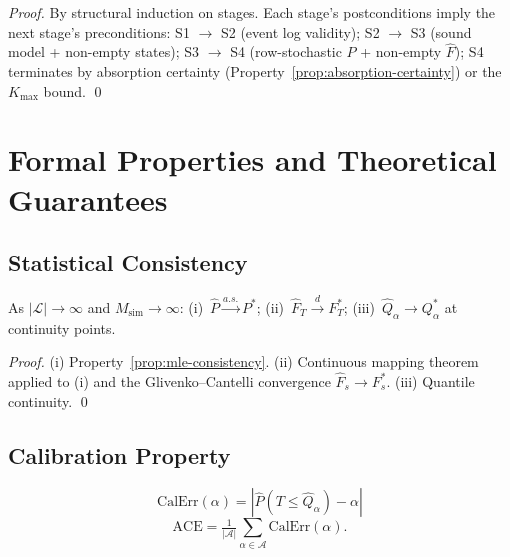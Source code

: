 \begin{proof}
By structural induction on stages. Each stage's postconditions imply the
next stage's preconditions: S1 $\to$ S2 (event log validity); S2 $\to$ S3
(sound model + non-empty states); S3 $\to$ S4 (row-stochastic $P$ +
non-empty $\hat{F}$); S4 terminates by absorption certainty
(Property~\ref{prop:absorption-certainty}) or the $K_{\max}$ bound. \qed
\end{proof}


\section{Formal Properties and Theoretical Guarantees}
\label{sec:method-properties}

\subsection{Statistical Consistency}
\label{sec:prop-consistency}

\begin{theorem}
\label{thm:consistency}
As $|\mathcal{L}| \to \infty$ and $M_{\text{sim}} \to \infty$:
(i)~$\hat{P} \xrightarrow{a.s.} P^*$;
(ii)~$\hat{F}_T \xrightarrow{d} F_T^*$;
(iii)~$\hat{Q}_\alpha \to Q_\alpha^*$ at continuity points.
\end{theorem}

\begin{proof}
(i) Property~\ref{prop:mle-consistency}.
(ii) Continuous mapping theorem applied to (i) and the Glivenko–Cantelli
convergence $\hat{F}_s \to F_s^*$.
(iii) Quantile continuity. \qed
\end{proof}


\subsection{Calibration Property}
\label{sec:prop-calibration}

\begin{definition}
\label{def:calibration}
\begin{equation}
\label{eq:calibration}
\text{CalErr}(\alpha) = |\hat{P}(T \leq \hat{Q}_\alpha) - \alpha|
\end{equation}
\begin{equation}
\label{eq:aggregate-calibration}
\text{ACE} = \tfrac{1}{|\mathcal{A}|} \sum_{\alpha \in \mathcal{A}}
    \text{CalErr}(\alpha).
\end{equation}
\end{definition}

